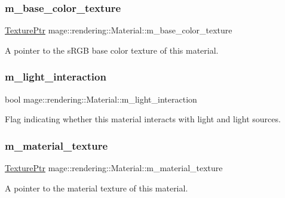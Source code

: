 \subsubsection{\texorpdfstring{m\+\_\+base\+\_\+color\+\_\+texture}{m\_base\_color\_texture}}
{\footnotesize\ttfamily \hyperlink{namespacemage_1_1rendering_a6f3ae54f825328465b0cdde0f0de4a36}{Texture\+Ptr} mage\+::rendering\+::\+Material\+::m\+\_\+base\+\_\+color\+\_\+texture\hspace{0.3cm}{\ttfamily [private]}}

A pointer to the s\+R\+GB base color texture of this material. \hypertarget{classmage_1_1rendering_1_1_material_aff4d7ceba071ecc00efa4188d7c22a46}{}\label{classmage_1_1rendering_1_1_material_aff4d7ceba071ecc00efa4188d7c22a46} 
\subsubsection{\texorpdfstring{m\+\_\+light\+\_\+interaction}{m\_light\_interaction}}
{\footnotesize\ttfamily bool mage\+::rendering\+::\+Material\+::m\+\_\+light\+\_\+interaction\hspace{0.3cm}{\ttfamily [private]}}

Flag indicating whether this material interacts with light and light sources. \hypertarget{classmage_1_1rendering_1_1_material_a4292698d8326e4f28dc45d59e00296dd}{}\label{classmage_1_1rendering_1_1_material_a4292698d8326e4f28dc45d59e00296dd} 
\subsubsection{\texorpdfstring{m\+\_\+material\+\_\+texture}{m\_material\_texture}}
{\footnotesize\ttfamily \hyperlink{namespacemage_1_1rendering_a6f3ae54f825328465b0cdde0f0de4a36}{Texture\+Ptr} mage\+::rendering\+::\+Material\+::m\+\_\+material\+\_\+texture\hspace{0.3cm}{\ttfamily [private]}}

A pointer to the material texture of this material.

